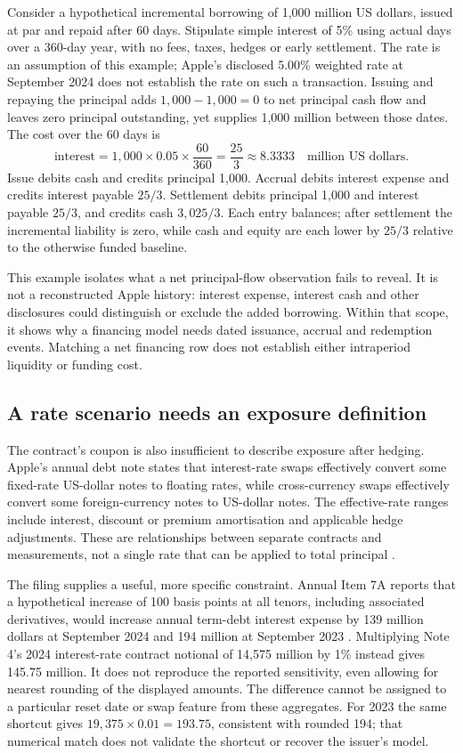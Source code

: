 Consider a hypothetical incremental borrowing of 1,000 million US dollars,
issued at par and repaid after 60 days. Stipulate simple interest of 5\% using
actual days over a 360-day year, with no fees, taxes, hedges or early settlement.
The rate is an assumption of this example; Apple's disclosed 5.00\% weighted
rate at September 2024 does not establish the rate on such a transaction.
Issuing and repaying the principal adds $1{,}000-1{,}000=0$ to net principal
cash flow and leaves zero principal outstanding, yet supplies 1,000 million
between those dates. The cost over the 60 days is
\[
 \text{interest}=1{,}000\times0.05\times\frac{60}{360}
               =\frac{25}{3}\approx8.3333
               \quad\text{million US dollars}.
\]
Issue debits cash and credits principal 1,000. Accrual debits interest expense
and credits interest payable $25/3$. Settlement debits principal 1,000 and
interest payable $25/3$, and credits cash $3{,}025/3$. Each entry balances;
after settlement the incremental liability is zero, while cash and equity are
each lower by $25/3$ relative to the otherwise funded baseline.

This example isolates what a net principal-flow observation fails to reveal.
It is not a reconstructed Apple history: interest expense, interest cash and
other disclosures could distinguish or exclude the added borrowing. Within
that scope, it shows why a financing model needs dated issuance, accrual and
redemption events. Matching a net financing row does not establish either
intraperiod liquidity or funding cost.

\subsection{A rate scenario needs an exposure definition}

The contract's coupon is also insufficient to describe exposure after hedging.
Apple's annual debt note states that interest-rate swaps effectively convert
some fixed-rate US-dollar notes to floating rates, while cross-currency swaps
effectively convert some foreign-currency notes to US-dollar notes. The
effective-rate ranges include interest, discount or premium amortisation and
applicable hedge adjustments. These are relationships between separate
contracts and measurements, not a single rate that can be applied to total
principal \citep[Note 9, printed p.~43]{apple2024}.

The filing supplies a useful, more specific constraint. Annual Item 7A reports
that a hypothetical increase of 100 basis points at all tenors, including
associated derivatives, would increase annual term-debt interest expense by
139 million dollars at September 2024 and 194 million at September 2023
\citep[printed p.~27]{apple2024}. Multiplying Note 4's 2024 interest-rate
contract notional of 14,575 million by 1\% instead gives 145.75 million. It does
not reproduce the reported sensitivity, even allowing for nearest rounding of
the displayed amounts. The difference cannot be assigned to a particular
reset date or swap feature from these aggregates. For 2023 the same shortcut
gives $19{,}375\times0.01=193.75$, consistent with rounded 194; that numerical
match does not validate the shortcut or recover the issuer's model.

